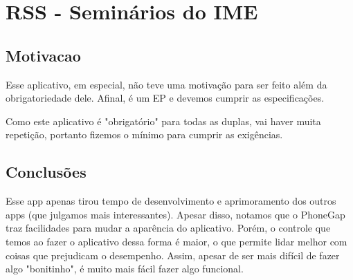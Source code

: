 \section{RSS - Seminários do IME}

\subsection{Motivacao}
Esse aplicativo, em especial, não teve uma motivação para ser feito além
da obrigatoriedade dele. Afinal, é um EP e devemos cumprir as
especificações.

Como este aplicativo é "obrigatório" para todas as duplas, vai haver muita
repetição, portanto fizemos o mínimo para cumprir as exigências.

\subsection{Conclusões}
Esse app apenas tirou tempo de desenvolvimento e aprimoramento dos outros apps (que julgamos mais interessantes). Apesar disso, notamos que o PhoneGap traz facilidades para mudar a aparência do aplicativo. Porém, o controle que temos ao fazer o aplicativo dessa forma é maior, o que permite lidar melhor com coisas que prejudicam o desempenho. Assim, apesar de ser mais difícil de fazer algo "bonitinho", é muito mais fácil fazer algo funcional.